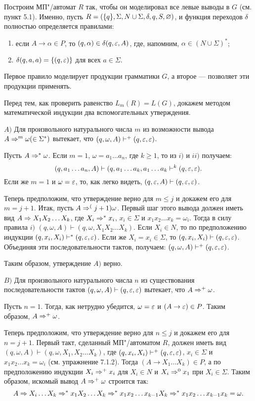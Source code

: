 \begin{myproof}
Построим МП"/автомат $R$ так, чтобы он моделировал все левые выводы в $G$ (см. пункт 5.1). Именно, пусть $R=(\{q\},\Sigma,N\cup\Sigma,\delta,q,S,\varnothing)$, и функция переходов $\delta$ полностью определяется правилами:
\begin{enumerate}[label=(\emph{\roman*})]
    \item если $A\to\alpha\in P$, то $(q,\alpha)\in\delta(q,\varepsilon,A)$, где, напомним, $\alpha\in(N\cup\Sigma)^*$;
    \item $\delta(q,a,a)=\{(q,\varepsilon)\}$ для всех $a\in\Sigma$.
\end{enumerate}
Первое правило моделирует продукции грамматики $G$, а второе --- позволяет эти продукции применять.

Перед тем, как проверить равенство $L_m(R)=L(G)$, докажем методом математической индукции два вспомогательных утверждения.

$A)$ Для произвольного натурального числа $m$ из возможности вывода $A\Rightarrow^m\omega(\in\Sigma^*)$ вытекает, что $(q,\omega,A)\vdash^+(q,\varepsilon,\varepsilon)$.

Пусть $A\Rightarrow^*\omega$. Если $m=1$, $\omega=a_1 \ldots a_n$, где $k\ge 1$, то из $i)$ и $ii)$ получаем:
\[
(q,a_1 \ldots a_n,A) \vdash (q,a_1 \ldots a_k,a_1 \ldots a_k\vdash^k (q,\varepsilon,\varepsilon).
\]
Если же $m=1$ и $\omega=\varepsilon$, то, как легко видеть, $(q,\varepsilon,A)\vdash (q,\varepsilon,\varepsilon)$.

Теперь предположим, что утверждение верно для $m\le j$ и докажем его для $m=j+1$. Итак, пусть $A\Rightarrow^(j+1)\omega$. Первый шаг этого вывода должен иметь вид $A\Rightarrow X_1X_2 \ldots X_k$, где $X_i\Rightarrow^*x_i$, $x_i\in\Sigma$ и $x_1x_2\ldots x_k=\omega_i$. Тогда в силу правила $i)$ $(q,\omega,A) \vdash (q,\omega,X_1X_2\ldots X_k)$. Если $X_i\in N$, то по предположению индукции $(q,x_i,X_i)\vdash^*(q,\varepsilon,\varepsilon)$. Если же $X_i=x_i\in\Sigma$, то $(q,x_i,X_i) \vdash  (q,\varepsilon,\varepsilon)$. Объединяя эти последовательности тактов, получаем: $(q,\omega,A) \vdash^+ (q,\varepsilon,\varepsilon)$.

Таким образом, утверждение $A)$ верно.

$B)$ Для произвольного натурального числа $n$ из существования последовательности тактов $(q,\omega,A)\vdash(q,\varepsilon,\varepsilon)$ вытекает, что $A\Rightarrow^+\omega$.

Пусть $n=1$. Тогда, как нетрудно убедится, $\omega=\varepsilon$ и $(A\to \varepsilon)\in P$. Таким образом, $A\Rightarrow^+\omega$.

Теперь предположим, что утверждение верно для $n\le j$ и докажем его для $n=j+1$. Первый такт, сделанный МП"/автоматом $R$, должен иметь вид $(q,\omega,A)\vdash(q,\omega,X_1,X_2\ldots X_k)$, где $(q,x_i,X_i)\vdash^+(q,\varepsilon,\varepsilon)$, $x_i\in\Sigma$ и $x_1x_2\ldots x_k=\omega_i$ (см. упражнение 7.1.2). Тогда $(A\to X_1\ldots X_k)\in P$, а по предположению индукции $X_i\Rightarrow^+x_i$ для $X_i\in N$ и $X_i\Rightarrow^0x_1$ при $X_i\in\Sigma$. Таким образом, искомый вывод $A\Rightarrow^+\omega$ строится так:
\[
    A   \Rightarrow X_i \ldots X_k \Rightarrow^* x_1X_2\ldots X_k
        \Rightarrow^* x_1x_2\ldots x_{k-1}X_k
        \Rightarrow^* x_1x_2\ldots x_{k-1}x_k=\omega.
\]


\end{myproof}
